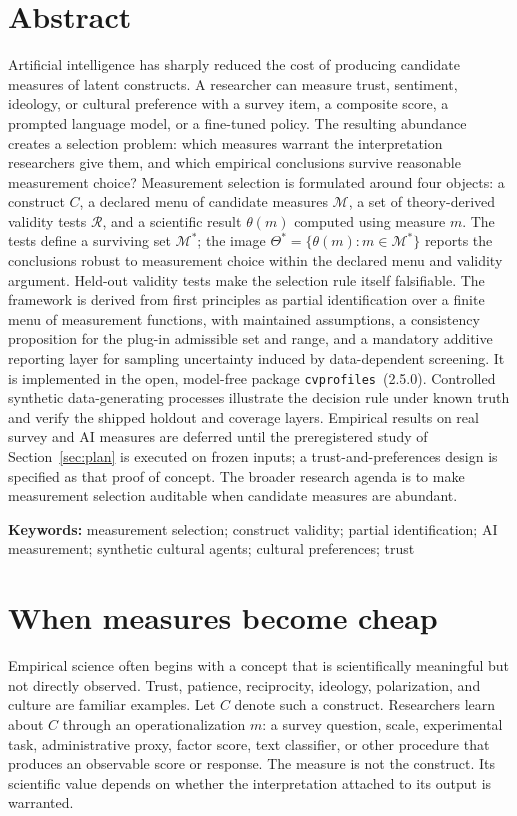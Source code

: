 \documentclass[10pt,letterpaper]{article}
\newcommand{\cvp}{\texttt{cvprofiles}}
\newcommand{\M}{\ensuremath{\mathcal{M}}}
\newcommand{\Rset}{\mathcal{R}}
\begin{document}
\section*{Abstract}
Artificial intelligence has sharply reduced the cost of producing candidate measures of latent constructs.
A researcher can measure trust, sentiment, ideology, or cultural preference with a survey item, a composite score, a prompted language model, or a fine-tuned policy.
The resulting abundance creates a selection problem: which measures warrant the interpretation researchers give them, and which empirical conclusions survive reasonable measurement choice?
Measurement selection is formulated around four objects: a construct $C$, a declared menu of candidate measures $\M$, a set of theory-derived validity tests $\Rset$, and a scientific result $\theta(m)$ computed using measure $m$.
The tests define a surviving set $\M^*$; the image $\Theta^*=\{\theta(m):m\in\M^*\}$ reports the conclusions robust to measurement choice within the declared menu and validity argument.
Held-out validity tests make the selection rule itself falsifiable.
The framework is derived from first principles as partial identification over a finite menu of measurement functions, with maintained assumptions, a consistency proposition for the plug-in admissible set and range, and a mandatory additive reporting layer for sampling uncertainty induced by data-dependent screening.
It is implemented in the open, model-free package \cvp{}~(2.5.0).
Controlled synthetic data-generating processes illustrate the decision rule under known truth and verify the shipped holdout and coverage layers.
Empirical results on real survey and AI measures are deferred until the preregistered study of Section~\ref{sec:plan} is executed on frozen inputs; a trust-and-preferences design is specified as that proof of concept.
The broader research agenda is to make measurement selection auditable when candidate measures are abundant.

\noindent\textbf{Keywords:}
measurement selection; construct validity; partial identification; AI measurement; synthetic cultural agents; cultural preferences; trust

\section{When measures become cheap}
Empirical science often begins with a concept that is scientifically meaningful but not directly observed.
Trust, patience, reciprocity, ideology, polarization, and culture are familiar examples.
Let $C$ denote such a construct.
Researchers learn about $C$ through an operationalization $m$: a survey question, scale, experimental task, administrative proxy, factor score, text classifier, or other procedure that produces an observable score or response.
The measure is not the construct.
Its scientific value depends on whether the interpretation attached to its output is warranted.
\end{document}

